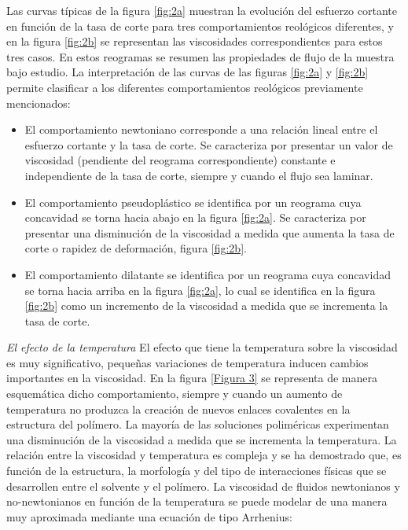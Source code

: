 \documentclass{elsarticle}
\begin{document}
Las curvas t\'ipicas de la figura \ref{fig:2a} muestran la evoluci\'on del esfuerzo cortante en funci\'on de la tasa de corte para tres comportamientos reol\'ogicos diferentes, y en la figura \ref{fig:2b} se representan las viscosidades correspondientes para estos tres casos. En estos reogramas se resumen las propiedades de flujo de la muestra bajo estudio. La interpretaci\'on de las curvas de las figuras \ref{fig:2a} y \ref{fig:2b} permite clasificar a los diferentes comportamientos reológicos previamente mencionados:
\begin{itemize}
    \item El comportamiento newtoniano corresponde a una relaci\'on lineal entre el esfuerzo cortante y la tasa de corte. Se caracteriza por presentar un valor de viscosidad (pendiente del reograma correspondiente) constante e independiente de la tasa de corte, siempre y cuando el flujo sea laminar.
    \item El comportamiento pseudopl\'astico se identifica por un reograma cuya concavidad se torna hacia abajo en la figura \ref{fig:2a}. Se caracteriza por presentar una disminuci\'on de la viscosidad a medida que aumenta la tasa de corte o rapidez de deformación, figura \ref{fig:2b}.
    \item El comportamiento dilatante se identifica por un reograma cuya concavidad se torna hacia arriba en la figura \ref{fig:2a}, lo cual se identifica en la figura \ref{fig:2b} como un incremento de la viscosidad a medida que se incrementa la tasa de corte.
\end{itemize}

\textit{El efecto de la temperatura}\newline
El efecto que tiene la temperatura sobre la viscosidad es muy significativo, pequeñas variaciones de temperatura inducen cambios importantes en la viscosidad. En la figura \ref{Figura 3} se representa de manera esquem\'atica dicho comportamiento, siempre y cuando un aumento de temperatura no produzca la creaci\'on de nuevos enlaces covalentes en la estructura del pol\'imero. La mayor\'ia de las soluciones polim\'ericas experimentan una disminuci\'on de la viscosidad a medida que se incrementa la temperatura. La relaci\'on entre la viscosidad y temperatura es compleja y se ha demostrado que, es funci\'on de la estructura, la morfolog\'ia y del tipo de interacciones f\'isicas que se desarrollen entre el solvente y el pol\'imero\cite{R13, R14}. La viscosidad de fluidos newtonianos y no-newtonianos en funci\'on de la temperatura se puede modelar de una manera muy aproximada mediante una ecuaci\'on de tipo Arrhenius:
\end{document}
